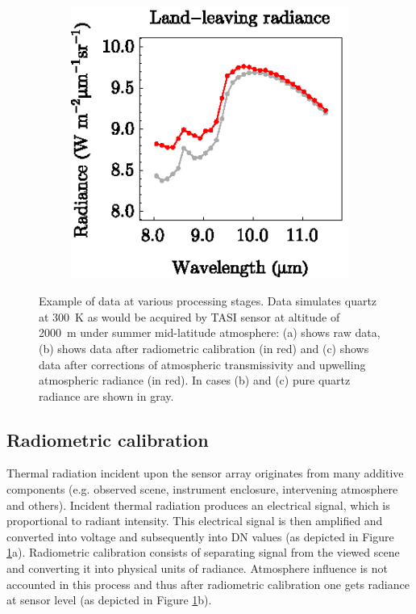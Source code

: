 \begin{figure}[htb]
	\hspace{1em}
	\begin{subfigure}[t]{.3\linewidth}
		\centering
		\includegraphics[scale=1]{pics/Chapter_02/calibration-3-Lll.eps}
		\vspace{-0.4cm}
		\caption{}
	\end{subfigure}
	\vspace{1.5 em}
	\caption{Example of data at various processing stages. Data simulates quartz at \SI{300}{\kelvin} as would be acquired by TASI sensor at altitude of \SI{2000}{\meter} under summer mid-latitude atmosphere: (a) shows raw data, (b) shows data after radiometric calibration (in red) and (c) shows data after corrections of atmospheric transmissivity and upwelling atmospheric radiance (in red). In cases (b) and (c) pure quartz radiance are shown in gray.}
	\label{fig:RadAtmCorOfQuartz}
\end{figure}

\subsection*{Radiometric calibration}

Thermal radiation incident upon the sensor array originates from many additive components (e.g. observed scene, instrument enclosure, intervening atmosphere and others). Incident thermal radiation produces an electrical signal, which is proportional to radiant intensity. This electrical signal is then amplified and converted into voltage and subsequently into DN values (as depicted in Figure \ref{fig:RadAtmCorOfQuartz}a). Radiometric calibration consists of separating signal from the viewed scene and converting it into physical units of radiance. Atmosphere influence is not accounted in this process and thus after radiometric calibration one gets radiance at sensor level (as depicted in Figure \ref{fig:RadAtmCorOfQuartz}b).

